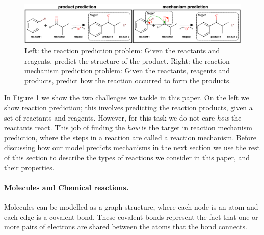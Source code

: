 

\begin{figure}[t!]
\centering
\includegraphics[width=\textwidth]{reaction_diagram}
\caption{Left: the reaction prediction problem: Given the reactants and reagents, predict the structure of the product. Right: the reaction mechanism prediction problem: Given the reactants, reagents and products, predict how the reaction occurred to form the products.}
\label{fig:task-overview}
\vspace{-1em}
\end{figure}


In Figure \ref{fig:task-overview} we show the two challenges we tackle in this paper. 
On the left we show reaction prediction; this involves predicting the reaction products, given a set of reactants and reagents. However, for this task we do not care {\em how} the reactants react.
 This job of finding the {\em how} is the target in reaction mechanism prediction, where the steps in a reaction are called a reaction mechanism.
 Before discussing how our model predicts mechanisms in the next section we use the rest of this section to describe the types of reactions we consider in this paper, and their properties.



\vspace{-0.15cm}
\paragraph{Molecules and Chemical reactions.}


Molecules can be modelled as a graph structure, where each node is an atom and each edge is a covalent bond.
These covalent bonds represent the fact that 
one or more pairs of electrons are shared between the atoms that the bond connects. 


